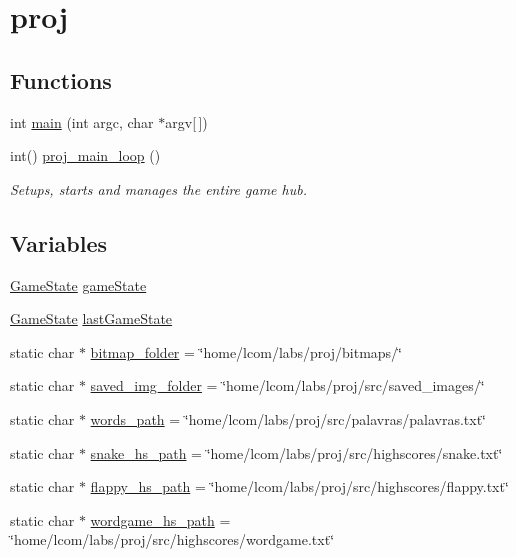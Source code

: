\hypertarget{group__proj}{}\section{proj}
\label{group__proj}
\subsection*{Functions}
\begin{DoxyCompactItemize}
\item 
int \mbox{\hyperlink{group__proj_ga0ddf1224851353fc92bfbff6f499fa97}{main}} (int argc, char $\ast$argv\mbox{[}$\,$\mbox{]})
\item 
int() \mbox{\hyperlink{group__proj_ga33bde23e0d2bbde847401c5ac6fb62e0}{proj\+\_\+main\+\_\+loop}} ()
\begin{DoxyCompactList}\small\item\em Setups, starts and manages the entire game hub. \end{DoxyCompactList}\end{DoxyCompactItemize}
\subsection*{Variables}
\begin{DoxyCompactItemize}
\item 
\mbox{\hyperlink{group__game__state_ga7899b65f1ea0f655e4bbf8d2a5714285}{Game\+State}} \mbox{\hyperlink{group__proj_ga2706ed05d331ef3b53c728a6868bda26}{game\+State}}
\item 
\mbox{\hyperlink{group__game__state_ga7899b65f1ea0f655e4bbf8d2a5714285}{Game\+State}} \mbox{\hyperlink{group__proj_ga52324cba31cbe30e5a1c1fa55962a9a6}{last\+Game\+State}}
\item 
static char $\ast$ \mbox{\hyperlink{group__proj_gaaf4b424c9c6851977bdc5db1af599155}{bitmap\+\_\+folder}} = \char`\"{}home/lcom/labs/proj/bitmaps/\char`\"{}
\item 
static char $\ast$ \mbox{\hyperlink{group__proj_ga0bd738406244c9e2cfb7a40534063a8d}{saved\+\_\+img\+\_\+folder}} = \char`\"{}home/lcom/labs/proj/src/saved\+\_\+images/\char`\"{}
\item 
static char $\ast$ \mbox{\hyperlink{group__proj_gabad57b50b76f053036285158aa06776f}{words\+\_\+path}} = \char`\"{}home/lcom/labs/proj/src/palavras/palavras.\+txt\char`\"{}
\item 
static char $\ast$ \mbox{\hyperlink{group__proj_ga7044526e97edbb5f8ac5cbcc8238b48e}{snake\+\_\+hs\+\_\+path}} = \char`\"{}home/lcom/labs/proj/src/highscores/snake.\+txt\char`\"{}
\item 
static char $\ast$ \mbox{\hyperlink{group__proj_ga226ced26c9ad1f22a223e7c25888e253}{flappy\+\_\+hs\+\_\+path}} = \char`\"{}home/lcom/labs/proj/src/highscores/flappy.\+txt\char`\"{}
\item 
static char $\ast$ \mbox{\hyperlink{group__proj_ga447ad354546d93c046464260d0b65703}{wordgame\+\_\+hs\+\_\+path}} = \char`\"{}home/lcom/labs/proj/src/highscores/wordgame.\+txt\char`\"{}
\end{DoxyCompactItemize}


